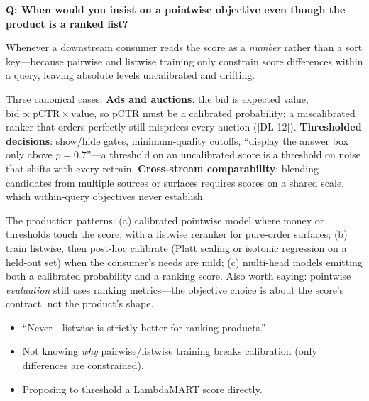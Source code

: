 \begin{interviewq}
\textbf{Q: When would you insist on a pointwise objective even though the product is a ranked list?}

 \quad {} \quad \badgefreq{\freqmed}

\stronganswer

Whenever a downstream consumer reads the score as a \textit{number} rather than a sort key---because pairwise and listwise training only constrain score differences within a query, leaving absolute levels uncalibrated and drifting.

Three canonical cases. \textbf{Ads and auctions}: the bid is expected value, $\text{bid} \propto \text{pCTR} \times \text{value}$, so pCTR must be a calibrated probability; a miscalibrated ranker that orders perfectly still misprices every auction ([DL 12]). \textbf{Thresholded decisions}: show/hide gates, minimum-quality cutoffs, ``display the answer box only above $p = 0.7$''---a threshold on an uncalibrated score is a threshold on noise that shifts with every retrain. \textbf{Cross-stream comparability}: blending candidates from multiple sources or surfaces requires scores on a shared scale, which within-query objectives never establish.

The production patterns: (a) calibrated pointwise model where money or thresholds touch the score, with a listwise reranker for pure-order surfaces; (b) train listwise, then post-hoc calibrate (Platt scaling or isotonic regression on a held-out set) when the consumer's needs are mild; (c) multi-head models emitting both a calibrated probability and a ranking score. Also worth saying: pointwise \textit{evaluation} still uses ranking metrics---the objective choice is about the score's contract, not the product's shape.

\redflags
\begin{itemize}
    \item ``Never---listwise is strictly better for ranking products.''
    \item Not knowing \textit{why} pairwise/listwise training breaks calibration (only differences are constrained).
    \item Proposing to threshold a LambdaMART score directly.
\end{itemize}



\end{interviewq}
